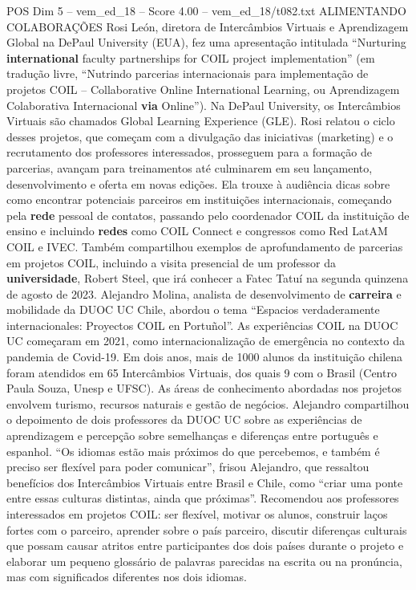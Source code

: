 \begin{textsample}{POS Dim 5 – vem\_ed\_18 – Score 4.00 – vem\_ed\_18/t082.txt}  \label{ex:f5_pos_041}
ALIMENTANDO COLABORAÇÕES Rosi León, diretora de Intercâmbios Virtuais e Aprendizagem Global na DePaul University (EUA), fez uma apresentação intitulada “Nurturing \textbf{international} faculty partnerships for COIL project implementation” (em tradução livre, “Nutrindo parcerias internacionais para implementação de projetos COIL – Collaborative Online International Learning, ou Aprendizagem Colaborativa Internacional \textbf{via} Online”).
Na DePaul University, os Intercâmbios Virtuais são chamados Global Learning Experience (GLE).
Rosi relatou o ciclo desses projetos, que começam com a divulgação das iniciativas (marketing) e o recrutamento dos professores interessados, prosseguem para a formação de parcerias, avançam para treinamentos até culminarem em seu lançamento, desenvolvimento e oferta em novas edições.
Ela trouxe à audiência dicas sobre como encontrar potenciais parceiros em instituições internacionais, começando pela \textbf{rede} pessoal de contatos, passando pelo coordenador COIL da instituição de ensino e incluindo \textbf{redes} como COIL Connect e congressos como Red LatAM COIL e IVEC.
Também compartilhou exemplos de aprofundamento de parcerias em projetos COIL, incluindo a visita presencial de um professor da \textbf{universidade}, Robert Steel, que irá conhecer a Fatec Tatuí na segunda quinzena de agosto de 2023.
Alejandro Molina, analista de desenvolvimento de \textbf{carreira} e mobilidade da DUOC UC Chile, abordou o tema “Espacios verdaderamente internacionales: Proyectos COIL en Portuñol”.
As experiências COIL na DUOC UC começaram em 2021, como internacionalização de emergência no contexto da pandemia de Covid-19.
Em dois anos, mais de 1000 alunos da instituição chilena foram atendidos em 65 Intercâmbios Virtuais, dos quais 9 com o Brasil (Centro Paula Souza, Unesp e UFSC).
As áreas de conhecimento abordadas nos projetos envolvem turismo, recursos naturais e gestão de negócios.
Alejandro compartilhou o depoimento de dois professores da DUOC UC sobre as experiências de aprendizagem e percepção sobre semelhanças e diferenças entre português e espanhol. “Os idiomas estão mais próximos do que percebemos, e também é preciso ser flexível para poder comunicar”, frisou Alejandro, que ressaltou benefícios dos Intercâmbios Virtuais entre Brasil e Chile, como “criar uma ponte entre essas culturas distintas, ainda que próximas”.
Recomendou aos professores interessados em projetos COIL: ser flexível, motivar os alunos, construir laços fortes com o parceiro, aprender sobre o país parceiro, discutir diferenças culturais que possam causar atritos entre participantes dos dois países durante o projeto e elaborar um pequeno glossário de palavras parecidas na escrita ou na pronúncia, mas com significados diferentes nos dois idiomas.

\end{textsample}
